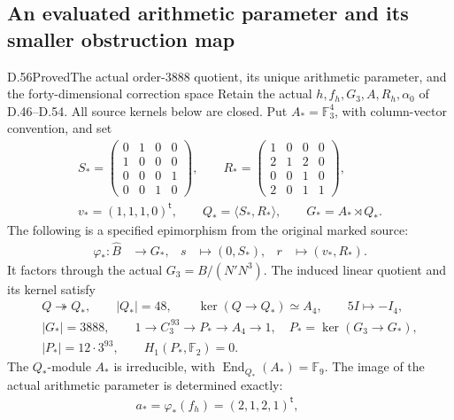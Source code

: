 \subsection{An evaluated arithmetic parameter and its smaller obstruction map}

\begin{statement}{D.56}{Proved}{The actual order-\(3888\) quotient, its unique arithmetic parameter, and the forty-dimensional correction space}
Retain the actual \(h,f_h,G_3,A,R_h,\alpha_0\)
of D.46--D.54. All source kernels below are closed.
Put \(A_*=\mathbb F_3^4\), with column-vector convention, and set
\[
 \begin{gathered}
 S_*=
 \begin{pmatrix}
 0&1&0&0\\1&0&0&0\\0&0&0&1\\0&0&1&0
 \end{pmatrix},\qquad
 R_*=
 \begin{pmatrix}
 1&0&0&0\\2&1&2&0\\0&0&1&0\\2&0&1&1
 \end{pmatrix},\\
 v_*=(1,1,1,0)^{\mathsf t},\qquad
 Q_*=\langle S_*,R_*\rangle,\qquad
 G_*=A_*\rtimes Q_* .
 \end{gathered}
 \tag{D.56.1}
\]
The following is a specified epimorphism from the original marked source:
\[
 \begin{aligned}
 \varphi_*:\widehat B&\longrightarrow G_*,
 &s&\longmapsto(0,S_*),
 &r&\longmapsto(v_*,R_*).
 \end{aligned}
 \tag{D.56.2}
\]
It factors through the actual \(G_3=B/(N'N^3)\).
The induced linear quotient and its kernel satisfy
\[
 \begin{gathered}
 Q\twoheadrightarrow Q_*,
 \qquad |Q_*|=48,\qquad
 \ker(Q\to Q_*)\simeq A_4,\qquad
 5I\longmapsto-I_4,\\
 |G_*|=3888,\qquad
 1\longrightarrow C_3^{\,93}\longrightarrow
 P_*\longrightarrow A_4\longrightarrow1,
 \quad P_*=\ker(G_3\to G_*),\\
 |P_*|=12\cdot3^{93},\qquad H_1(P_*,\mathbb F_2)=0 .
 \end{gathered}
 \tag{D.56.3}
\]
The \(Q_*\)-module \(A_*\) is irreducible, with
\(\operatorname{End}_{Q_*}(A_*)=\mathbb F_9\).
The image of the actual arithmetic parameter is determined exactly:
\[
 \begin{gathered}
 a_*=\varphi_*(f_h)=(2,1,2,1)^{\mathsf t},\qquad

\end{gathered}\]
\end{statement}
